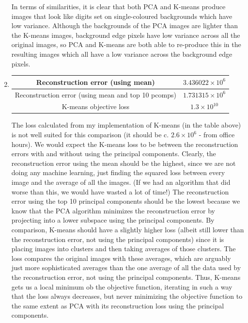 \documentclass[submit]{harvardml}
\begin{document}
\begin{enumerate}
  In terms of similarities, it is clear that both PCA and K-means produce images that look like digits set on single-coloured backgrounds which have low variance. Although the backgrounds of the PCA images are lighter than the K-means images, background edge pixels have low variance across all the original images, so PCA and K-means are both able to re-produce this in the resulting images which all have a low variance across the background edge pixels.
  
  \item \quad
    \begin{center}
        \begin{tabular}{ |c|c| } 
        \hline
        Reconstruction error (using mean) & $3.436022 \times 10^6$ \\
        \hline
        Reconstruction error (using mean and top 10 pcomps) & $1.731315 \times 10^6$\\
        \hline
        K-means objective loss & $1.3 \times 10^10$\\
        \hline
        \end{tabular}
    \end{center}
    The loss calculated from my implementation of K-means (in the table above) is not well suited for this comparison (it should be c. $2.6 \times 10^6$ - from office hours). We would expect the K-means loss to be between the reconstruction errors with and without using the principal components. Clearly, the reconstruction error using the mean should be the highest, since we are not doing any machine learning, just finding the squared loss between every image and the average of all the images. (If we had an algorithm that did worse than this, we would have wasted a lot of time!) The reconstruction error  using the top 10 principal components should be the lowest because we know that the PCA algorithm minimizes the reconstruction error by projecting into a lower subspace using the principal components. By comparison, K-means should have a slightly higher loss (albeit still lower than the reconstruction error, not using the principal components) since it is placing images into clusters and then taking averages of those clusters. The loss compares the original images with these averages, which are arguably just more sophisticated averages than the one average of all the data used by the reconstruction error, not using the principal components. Thus, K-means gets us a local minimum ob the objective function, iterating in such a way that the loss always decreases, but never minimizing the objective function to the same extent as PCA with its reconstruction loss using the principal components.


\end{enumerate}
\end{document}
